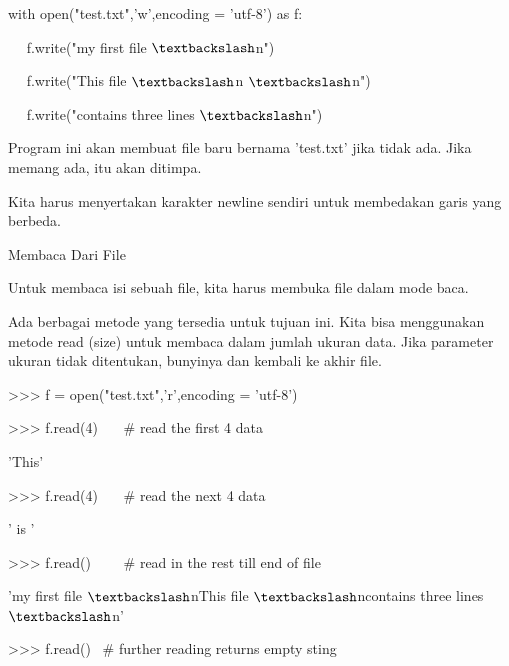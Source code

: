 \vspace{12pt}
\noindent 
with open("test.txt",'w',encoding = 'utf-8') as f: \par
\noindent 
~~ f.write("my first file $  \textbackslash  $n") \par
\noindent 
~~ f.write("This file $  \textbackslash  $n $  \textbackslash  $n") \par
\noindent 
~~ f.write("contains three lines $  \textbackslash  $n") \par
\vspace{12pt}
\noindent 
Program ini akan membuat file baru bernama 'test.txt' jika tidak ada. Jika memang ada, itu akan ditimpa. \par
\vspace{12pt}
\noindent 
Kita harus menyertakan karakter newline sendiri untuk membedakan garis yang berbeda. \par
\noindent 
Membaca Dari File \par
\vspace{12pt}
\noindent 
Untuk membaca isi sebuah file, kita harus membuka file dalam mode baca. \par
\vspace{12pt}
\noindent 
Ada berbagai metode yang tersedia untuk tujuan ini. Kita bisa menggunakan metode read (size) untuk membaca dalam jumlah ukuran data. Jika parameter ukuran tidak ditentukan, bunyinya dan kembali ke akhir file. \par
\vspace{12pt}
\vspace{12pt}
\noindent 
>>> f = open("test.txt",'r',encoding = 'utf-8') \par
\noindent 
>>> f.read(4)~~~  $  \#  $ read the first 4 data \par
\noindent 
'This' \par
\vspace{12pt}
\noindent 
>>> f.read(4)~~~  $  \#  $ read the next 4 data \par
\noindent 
' is ' \par
\vspace{12pt}
\noindent 
>>> f.read()~~~~  $  \#  $ read in the rest till end of file \par
\noindent 
'my first file $  \textbackslash  $nThis file $  \textbackslash  $ncontains three lines $  \textbackslash  $n' \par
\vspace{12pt}
\noindent 
>>> f.read()~  $  \#  $ further reading returns empty sting \par
\vspace{12pt}
